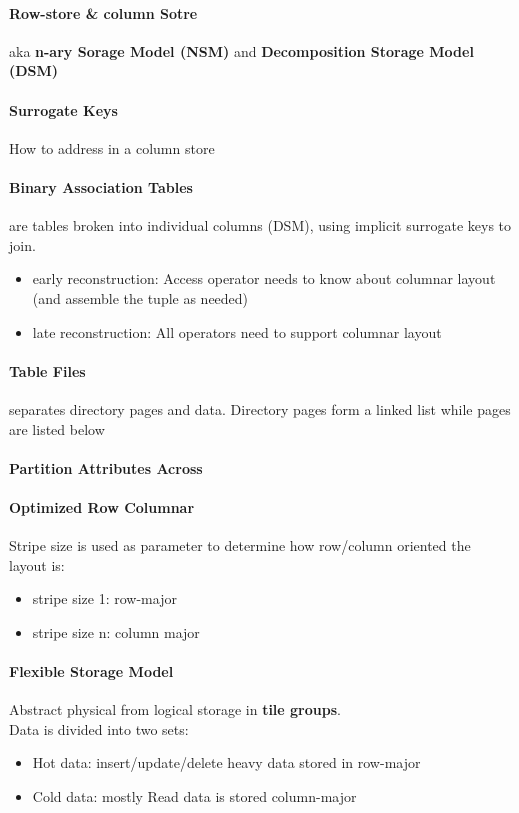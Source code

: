 \paragraph{Row-store \& column Sotre} aka \textbf{n-ary Sorage Model (NSM)} and \textbf{Decomposition Storage Model (DSM)}

\paragraph{Surrogate Keys}
How to address in a column store

\paragraph{Binary Association Tables} are tables broken into individual columns (DSM), using implicit surrogate keys to join.
\begin{itemize}
    \item early reconstruction: Access operator needs to know about columnar layout (and assemble the tuple as needed)
    \item late reconstruction: All operators need to support columnar layout
\end{itemize}

\paragraph{Table Files} separates directory pages and data. Directory pages form a linked list while pages are listed below

\paragraph{Partition Attributes Across}

\paragraph{Optimized Row Columnar}
Stripe size is used as parameter to determine how row/column oriented the layout is: 
\begin{itemize}
    \item stripe size 1: row-major
    \item stripe size n: column major
\end{itemize}

\paragraph{Flexible Storage Model}
Abstract physical from logical storage in \textbf{tile groups}.\\
Data is divided into two sets: 
\begin{itemize}
    \item Hot data: insert/update/delete heavy data stored in row-major
    \item Cold data: mostly Read data is stored column-major
\end{itemize}

